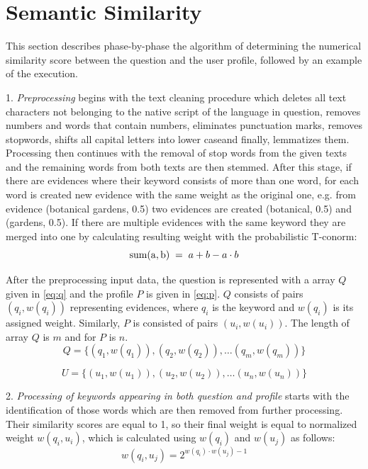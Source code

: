 \documentclass[conference]{IEEEtran}
\begin{document}
\section{Semantic Similarity}
\label{sec:alg}
This section describes phase-by-phase the algorithm of determining the numerical similarity score between the question and the user profile, followed by an example of the execution. 
	
1. {\it Preprocessing} begins with the text cleaning procedure which deletes all text characters not belonging to the native script of the language in question, removes numbers and words that contain numbers, eliminates punctuation marks, removes stopwords, shifts all capital letters into lower caseand finally, lemmatizes them. Processing then continues with the removal of stop words from the given texts and the remaining words from both texts are then stemmed. After this stage, if there are evidences where their keyword consists of more than one word, for each word is created new evidence with the same weight as the original one, e.g. from evidence (botanical gardens, 0.5) two evidences are created (botanical, 0.5) and (gardens, 0.5). If there are multiple evidences with the same keyword they are merged into one by calculating resulting weight with the probabilistic T-conorm: 
\begin{equation}
	\label{eq:tconorm}
	{\rm sum(a,b)}\;=\;a+b-a\cdot b
\end{equation}

After the preprocessing input data, the question is represented with a array $Q$ given in \ref{eq:q} and the profile $P$ is given in \ref{eq:p}. $Q$ consists of pairs $(q_i,w(q_i))$ representing evidences, where $q_i$ is the keyword and $w(q_i)$ is its assigned weight. Similarly, $P$ is consisted of pairs $(u_i,w(u_i))$. The length of array $Q$ is $m$ and for $P$ is $n$.
\begin{equation}
	\label{eq:q}
	Q = \{(q_1,w(q_1)),(q_2,w(q_2)),\ldots(q_m,w(q_m))\}
\end{equation} 

\begin{equation}
	\label{eq:p}
	U=\{(u_1,w(u_1)),(u_2,w(u_2)),\ldots(u_n,w(u_n))\}
\end{equation}

    
2. {\it Processing of keywords appearing in both question and profile} starts with the identification of those words which are then removed from further processing. Their similarity scores are equal to 1, so their final weight is equal to normalized weight $w(q_i,u_i)$, which is calculated using $w(q_i)$ and $w(u_j)$ as follows:
\begin{equation}
	\label{eq:w}
	w(q_i,u_j)=2^{w(q_i)\cdot w(u_j)-1}
\end{equation}
\end{document}
